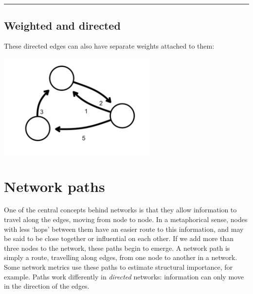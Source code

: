 \documentclass[
]{book}
\begin{document}
\begin{center}\rule{0.5\linewidth}{0.5pt}\end{center}

\hypertarget{weighted-and-directed}{%
\subsection{Weighted and directed}\label{weighted-and-directed}}

These directed edges can also have separate weights attached to them:

\includegraphics[width=3.125in,height=\textheight]{images/Screenshot 2022-09-26 at 11.31.15.png}

\hypertarget{network-paths}{%
\section{Network paths}\label{network-paths}}

One of the central concepts behind networks is that they allow information to travel along the edges, moving from node to node. In a metaphorical sense, nodes with less `hops' between them have an easier route to this information, and may be said to be close together or influential on each other. If we add more than three nodes to the network, these paths begin to emerge. A network path is simply a route, travelling along edges, from one node to another in a network. Some network metrics use these paths to estimate structural importance, for example. Paths work differently in \emph{directed} networks: information can only move in the direction of the edges.
\end{document}
